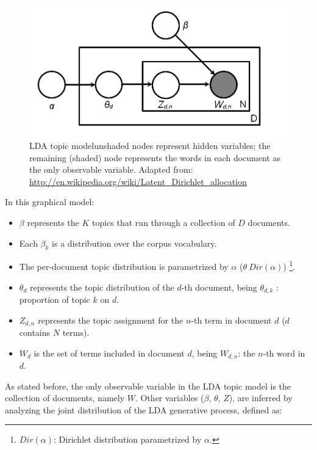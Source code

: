 \begin{figure}
\center\includegraphics[scale=0.4]{images/lda-formal-model}

\caption{LDA topic model\textemdash{}unshaded nodes represent hidden variables; the remaining (shaded) node represents the words in each document
as the only observable variable. {\scriptsize Adapted from: \protect\href{http://en.wikipedia.org/wiki/Latent_Dirichlet_allocation}{http://en.wikipedia.org/wiki/Latent\_{}Dirichlet\_{}allocation}}}
\label{lda-formal-definition}

\end{figure}

In this graphical model:

\begin{itemize}
\item $\beta$ represents the $K$ topics that run through a collection of $D$ documents. 
\item Each $\beta_{k}$ is a distribution over the corpus vocabulary. 
\item The per-document topic distribution is parametrized by $\alpha$ ($\theta~Dir(\alpha)$) \footnote{$Dir(\alpha)$: Dirichlet distribution parametrized by $\alpha$.
}.
\item $\theta_{d}$ represents the topic distribution of the $d$-th document, being $\theta_{d,k}$ : proportion of topic $k$ on $d$.
\item $Z_{d,n}$ represents the topic assignment for the $n$-th term in document $d$ ($d$ contains $N$ terms). 
\item $W_{d}$ is the set of terms included in document $d$, being $W_{d,n}$: the $n$-th word in $d$. 
\end{itemize}

As stated before, the only observable variable in the LDA topic model is the collection of documents, namely $W$. Other variables ($\beta$, $\theta$, $Z$), are inferred by analyzing the joint distribution of the LDA generative process, defined as:


